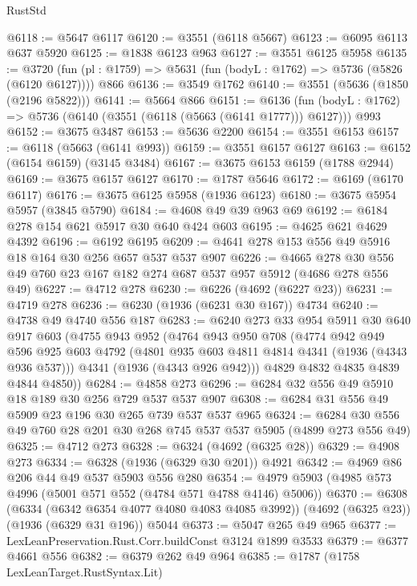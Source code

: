 \begin{lexlean}{RustStd}
\begin{coremodule}
@6118 := @5647 @6117
@6120 := @3551 (@6118 @5667)
@6123 := @6095 @6113 @637 @5920
@6125 := @1838 @6123 @963
@6127 := @3551 @6125 @5958
@6135 := @3720 (fun (pl : @1759) => @5631 (fun (bodyL : @1762) => @5736 (@5826 (@6120 @6127)))) @866
@6136 := @3549 @1762
@6140 := @3551 (@5636 (@1850 (@2196 @5822)))
@6141 := @5664 @866
@6151 := @6136
    (fun (bodyL : @1762) => @5736 (@6140 (@3551 (@6118 (@5663 (@6141 @1777))) @6127)))
    @993
@6152 := @3675 @3487
@6153 := @5636 @2200
@6154 := @3551 @6153
@6157 := @6118 (@5663 (@6141 @993))
@6159 := @3551 @6157 @6127
@6163 := @6152 (@6154 @6159) (@3145 @3484)
@6167 := @3675 @6153 @6159 (@1788 @2944)
@6169 := @3675 @6157 @6127
@6170 := @1787 @5646
@6172 := @6169 (@6170 @6117)
@6176 := @3675 @6125 @5958 (@1936 @6123)
@6180 := @3675 @5954 @5957 (@3845 @5790)
@6184 := @4608 @49 @39 @963 @69
@6192 := @6184 @278 @154 @621 @5917 @30 @640 @424 @603
@6195 := @4625 @621 @4629 @4392
@6196 := @6192 @6195
@6209 := @4641 @278 @153 @556 @49 @5916 @18 @164 @30 @256 @657 @537 @537 @907
@6226 := @4665 @278 @30 @556 @49 @760 @23 @167 @182 @274 @687 @537 @957 @5912 (@4686 @278 @556 @49)
@6227 := @4712 @278
@6230 := @6226 (@4692 (@6227 @23))
@6231 := @4719 @278
@6236 := @6230 (@1936 (@6231 @30 @167)) @4734
@6240 := @4738 @49 @4740 @556 @187
@6283 := @6240
    @273
    @33
    @954
    @5911
    @30
    @640
    @917
    @603
    (@4755
      @943
      @952
      (@4764
        @943
        @950
        @708
        (@4774
          @942
          @949
          @596
          @925
          @603
          @4792
          (@4801 @935 @603 @4811 @4814 @4341 (@1936 (@4343 @936 @537)))
          @4341
          (@1936 (@4343 @926 @942)))
        @4829
        @4832
        @4835
        @4839
        @4844
        @4850))
@6284 := @4858 @273
@6296 := @6284 @32 @556 @49 @5910 @18 @189 @30 @256 @729 @537 @537 @907
@6308 := @6284 @31 @556 @49 @5909 @23 @196 @30 @265 @739 @537 @537 @965
@6324 := @6284 @30 @556 @49 @760 @28 @201 @30 @268 @745 @537 @537 @5905 (@4899 @273 @556 @49)
@6325 := @4712 @273
@6328 := @6324 (@4692 (@6325 @28))
@6329 := @4908 @273
@6334 := @6328 (@1936 (@6329 @30 @201)) @4921
@6342 := @4969 @86 @206 @44 @49 @537 @5903 @556 @280
@6354 := @4979 @5903 (@4985 @573 @4996 (@5001 @571 @552 (@4784 @571 @4788 @4146) @5006))
@6370 := @6308
    (@6334 (@6342 @6354 @4077 @4080 @4083 @4085 @3992))
    (@4692 (@6325 @23))
    (@1936 (@6329 @31 @196))
    @5044
@6373 := @5047 @265 @49 @965
@6377 := LexLeanPreservation.Rust.Corr.buildConst @3124 @1899 @3533
@6379 := @6377 @4661 @556
@6382 := @6379 @262 @49 @964
@6385 := @1787 (@1758 LexLeanTarget.RustSyntax.Lit)

\end{coremodule}
\end{lexlean}
